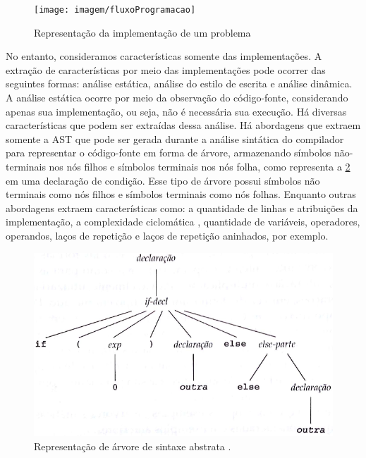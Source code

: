 			\begin{figure}[h]
				\centering
				\texttt{[image: imagem/fluxoProgramacao]}
				\caption{Representação da implementação de um problema}
				\label{fig:fluxoProgramacao}
			\end{figure}
			
			No entanto, consideramos características somente das implementações.
			A extração de características por meio das implementações pode ocorrer das
			seguintes formas: análise estática, análise do estilo de escrita e análise dinâmica.
			A análise estática ocorre por meio da observação do código-fonte, considerando
			apenas sua implementação, ou seja, não é necessária sua execução. Há diversas
			características que podem ser extraídas dessa análise. Há abordagens que extraem
			somente a \ac{AST} que pode ser gerada durante a análise
			sintática do compilador para representar o código-fonte em forma de árvore,
			armazenando símbolos não-terminais nos nós filhos e símbolos terminais nos
			nós folha, como representa a \cref{fig:AST} em uma declaração de condição.
			Esse tipo de árvore possui símbolos não terminais como nós filhos
			e símbolos terminais como nós folhas. Enquanto outras abordagens extraem
			características como: a quantidade de linhas e atribuições da implementação,
			a complexidade ciclomática \cite{mccabe}, quantidade de variáveis, operadores,
			operandos, laços de repetição e laços de repetição aninhados, por exemplo.
						
			\begin{figure}[h]
				\centering
				\includegraphics[width=0.7\linewidth]{imagem/AST}
				\caption[Representação de árvore de sintaxe abstrata]{Representação de árvore de sintaxe abstrata \cite{louden2004}.}
				\label{fig:AST}
			\end{figure}
			
